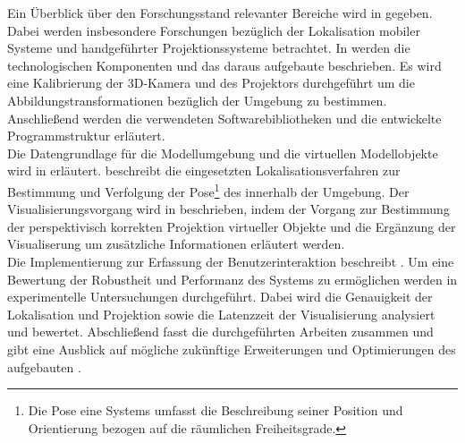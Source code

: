 Ein Überblick über den Forschungsstand relevanter Bereiche wird in  gegeben. Dabei werden insbesondere Forschungen bezüglich der Lokalisation mobiler Systeme und handgeführter Projektionssysteme betrachtet. In  werden die technologischen Komponenten und das daraus aufgebaute \kps{} beschrieben. Es wird eine Kalibrierung der 3D-Kamera und des Projektors durchgeführt um die Abbildungstransformationen bezüglich der Umgebung zu bestimmen. Anschließend werden die verwendeten Softwarebibliotheken und die entwickelte Programmstruktur erläutert.\\
Die Datengrundlage für die Modellumgebung und die virtuellen Modellobjekte wird in  erläutert.  beschreibt die eingesetzten Lokalisationsverfahren zur Bestimmung und Verfolgung der Pose\footnote{Die Pose eine Systems umfasst die Beschreibung seiner Position und Orientierung bezogen auf die räumlichen Freiheitsgrade.
}
 des  innerhalb der Umgebung. Der Visualisierungsvorgang wird in  beschrieben, indem der Vorgang zur Bestimmung der perspektivisch korrekten Projektion virtueller Objekte und die Ergänzung der Visualiserung um zusätzliche Informationen erläutert werden.\\
Die Implementierung zur Erfassung der Benutzerinteraktion beschreibt . Um eine Bewertung der Robustheit und Performanz des Systems zu ermöglichen werden in  experimentelle Untersuchungen durchgeführt. Dabei wird die Genauigkeit der Lokalisation und Projektion sowie die Latenzzeit der Visualisierung analysiert und bewertet. Abschließend fasst  die durchgeführten Arbeiten zusammen und gibt eine Ausblick auf mögliche zukünftige Erweiterungen und Optimierungen des aufgebauten .

